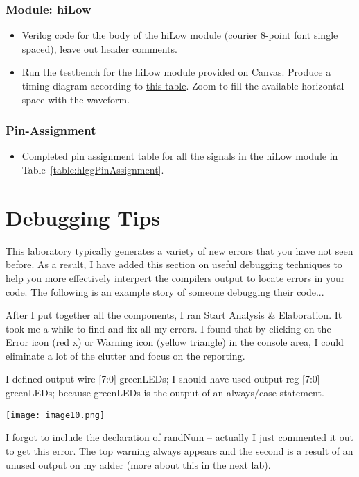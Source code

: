 \subsubsection{Module: hiLow}


\begin{itemize}
\item
  Verilog code for the body of the hiLow module (courier 8-point
  font single spaced), leave out header comments.
\item
  Run the testbench for the hiLow module provided on Canvas.
  Produce a timing diagram according to
  \hyperlink{hlgg:signalColor}{this table}. Zoom to
  fill the available horizontal space with the waveform. 
\end{itemize}

\subsubsection{Pin-Assignment}

\begin{itemize}
\item Completed pin assignment table for all the signals in the hiLow module in Table~\ref{table:hlggPinAssignment}.
\end{itemize}


\section{Debugging Tips}
This laboratory typically generates a variety of new errors that you 
have not seen before.  As a result, I have added this section on 
useful debugging techniques to help you more effectively 
interpert the compilers output to locate errors in your code.
The following is an example story of someone debugging their code...

After I put together all the components, I ran Start Analysis \&
Elaboration. It took me a while to find and fix all my errors. I found
that by clicking on the Error icon (red x) or Warning icon (yellow
triangle) in the console area, I could eliminate a lot of the clutter
and focus on the reporting.

I defined output wire {[}7:0{]} greenLEDs; I should have used output reg
{[}7:0{]} greenLEDs; because greenLEDs is the output of an always/case
statement.

\texttt{[image: image10.png]}

I forgot to include the declaration of randNum -- actually I just
commented it out to get this error. The top warning always appears and
the second is a result of an unused output on my adder (more about this
in the next lab).

